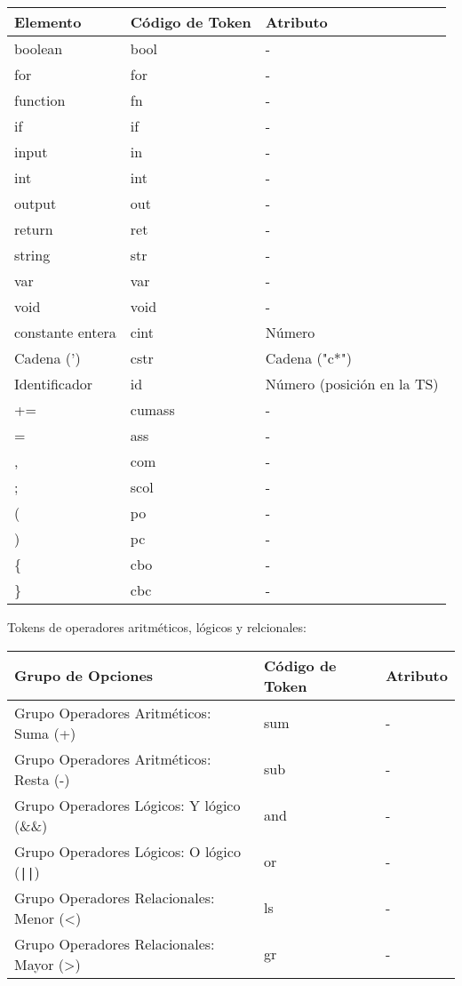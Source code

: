 \documentclass{article}
\begin{document}
\begin{table}[h!]
    \centering
    \begin{tabular}{|l|l|l|}
        \hline
		\rowcolor{gray!20} %
        \textbf{Elemento} & \textbf{Código de Token} & \textbf{Atributo} \\ \hline
        boolean & bool & - \\ \hline
        for & for & - \\ \hline
        function & fn & - \\ \hline
        if & if & - \\ \hline
        input & in & - \\ \hline
        int & int & - \\ \hline
        output & out & - \\ \hline
        return & ret & - \\ \hline
        string & str & - \\ \hline
        var & var & - \\ \hline
        void & void & - \\ \hline
        constante entera & cint & Número \\ \hline
        Cadena (') & cstr & Cadena ("c*") \\ \hline
		Identificador & id & Número (posición en la TS) \\ \hline
        += & cumass & - \\ \hline
        = & ass & - \\ \hline
        , & com & - \\ \hline
        ; & scol & - \\ \hline
        ( & po & - \\ \hline
        ) & pc & - \\ \hline
        \{ & cbo & - \\ \hline
        \} & cbc & - \\ \hline
    \end{tabular}
\end{table}

Tokens de operadores aritméticos, lógicos y relcionales:
\begin{table}[h!]
    \centering
    \begin{tabular}{|l|l|l|}
        \hline
		\rowcolor{gray!20} %
        \textbf{Grupo de Opciones} & \textbf{Código de Token} & \textbf{Atributo} \\ \hline
        Grupo Operadores Aritméticos: Suma (+) & sum & - \\ \hline
        Grupo Operadores Aritméticos: Resta (-) & sub & - \\ \hline
        Grupo Operadores Lógicos: Y lógico (\&\&) & and & - \\ \hline
        Grupo Operadores Lógicos: O lógico (\texttt{||}) & or & - \\ \hline
        Grupo Operadores Relacionales: Menor (\textless) & ls & - \\ \hline
        Grupo Operadores Relacionales: Mayor (\textgreater) & gr & - \\ \hline
    \end{tabular}
\end{table}
\end{document}
